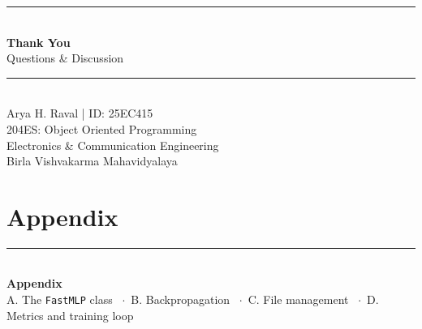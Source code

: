 \documentclass[aspectratio=169]{beamer}
\begin{document}
{
\begin{frame}[plain]
  \centering
  \vspace{1.5cm}
  {\color{accent}\rule{1.2cm}{1.2mm}}\\[0.4cm]
  {\color{white}\Large\textbf{Thank You}}\\[0.4cm]
  {\color{white!70}\normalsize Questions \& Discussion}\\[0.5cm]
  {\color{white!25}\rule{0.5\textwidth}{0.5pt}}\\[0.4cm]
  {\color{white!60}\small
    Arya H. Raval | ID: 25EC415\\[0.1cm]
    204ES: Object Oriented Programming\\
    Electronics \& Communication Engineering \\
    Birla Vishvakarma Mahavidyalaya
  }
\end{frame}
}

\appendix
\section{Appendix}

{
\begin{frame}[plain]
  \centering
  \vspace{2.2cm}
  {\color{accent}\rule{1.2cm}{1.2mm}}\\[0.4cm]
  {\color{white}\Large\textbf{Appendix}}\\[0.3cm]
  {\color{white!70}\small A. The \texttt{FastMLP} class \ $\cdot$\ B. Backpropagation \ $\cdot$\ C. File management \ $\cdot$\ D. Metrics and training loop}
\end{frame}
}
\end{document}
